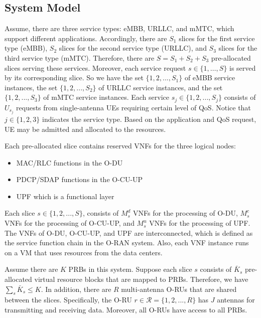 \documentclass[lettersize,journal]{IEEEtran}
\begin{document}
\subsection{System Model}
Assume, there are three service types: eMBB, URLLC, and mMTC, which support different applications. Accordingly, there are $S_1$ slices for the first service type (eMBB), $S_2$ slices for the second service type (URLLC), and $S_3$ slices for the third service type (mMTC).
Therefore, there are $S = S_1 + S_2 + S_3$ pre-allocated slices serving these services.
Moreover, each service request $s\in \{1,\ldots,S\}$ is served by its corresponding slice. So we have the set
$\{1,2,...,S_1\}$ of eMBB service instances, the set $\{1,2,...,S_2\}$ of URLLC service instances, and the set
$\{1,2,...,S_3\}$ of mMTC service instances.
Each service $s_j\in \{1,2,...,S_j\} $ consists of $U_{s_j}$ requests from  single-antenna UEs requiring certain level of QoS. Notice that $j \in \{1,2,3\}$ indicates the service type.
Based on the application and QoS request, UE may be admitted and allocated to the resources.

Each pre-allocated slice contains reserved VNFs for the three logical nodes:
\begin{itemize}
\item MAC/RLC functions in the O-DU 
\item PDCP/SDAP functions in the O-CU-UP
\item UPF which is a functional layer
\end{itemize}
Each slice $s \in \{1,2,...,S \}$, consists of  $M_s^{d}$ VNFs for the processing of O-DU, $M_s^{c}$ VNFs for the processing of O-CU-UP, and $M_s^{u}$ VNFs for the processing of UPF.
The VNFs of O-DU, O-CU-UP, and UPF are interconnected, which is defined as the service function chain in the O-RAN system. Also, each VNF instance runs on a VM that uses resources from the data centers.


Assume there are $K$ PRBs in this system. Suppose each slice $s$ consists of $\bar{K}_s$ pre-allocated virtual resource blocks that are mapped to PRBs. Therefore, we have $\sum_s \bar{K}_s \leq K$.
In addition, there are $R$ multi-antenna O-RUs that are shared between the slices. Specifically, the O-RU $r \in \mathcal{R}=\{1,2,...,R \}$ has $J$ antennas for transmitting and receiving data. Moreover, all O-RUs have access to all PRBs.

\end{document}
